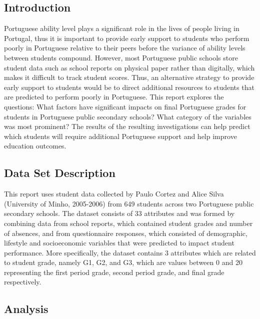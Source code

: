 \documentclass[a4paper,8pt,twocolumn,twoside,]{pinp}
\begin{document}
\hypertarget{introduction}{%
\subsection{Introduction}\label{introduction}}

Portuguese ability level plays a significant role in the lives of people
living in Portugal, thus it is important to provide early support to
students who perform poorly in Portuguese relative to their peers before
the variance of ability levels between students compound. However, most
Portuguese public schools store student data such as school reports on
physical paper rather than digitally, which makes it difficult to track
student scores. Thus, an alternative strategy to provide early support
to students would be to direct additional resources to students that are
predicted to perform poorly in Portuguese. This report explores the
questions: What factors have significant impacts on final Portuguese
grades for students in Portuguese public secondary schools? What
category of the variables was most prominent? The results of the
resulting investigations can help predict which students will require
additional Portuguese support and help improve education outcomes.

\hypertarget{data-set-description}{%
\subsection{Data Set Description}\label{data-set-description}}

This report uses student data collected by Paulo Cortez and Alice Silva
(University of Minho, 2005-2006) from 649 students across two Portuguese
public secondary schools. The dataset consists of 33 attributes and was
formed by combining data from school reports, which contained student
grades and number of absences, and from questionnaire responses, which
consisted of demographic, lifestyle and socioeconomic variables that
were predicted to impact student performance. More specifically, the
dataset contains 3 attributes which are related to student grade, namely
G1, G2, and G3, which are values between 0 and 20 representing the first
period grade, second period grade, and final grade respectively.

\hypertarget{analysis}{%
\subsection{Analysis}\label{analysis}}
\end{document}
